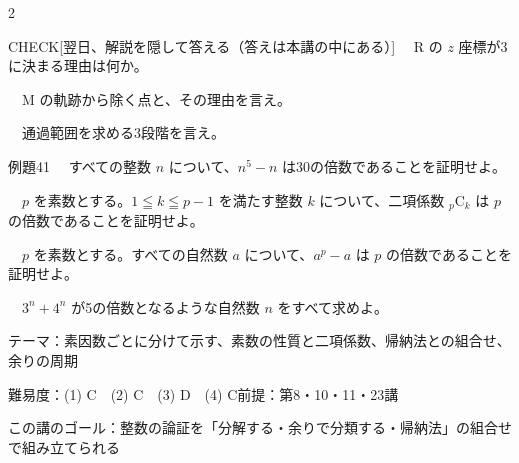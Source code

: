 \documentclass[paper=b5j, fontsize=8pt, fleqn, twoside]{jlreq}
\begin{document}
\begin{multicols*}{2}
  \begin{ptbs}{CHECK}[翌日、解説を隠して答える（答えは本講の中にある）]
    　R の $z$ 座標が3に決まる理由は何か。\par
    　M の軌跡から除く点と、その理由を言え。\par
    　通過範囲を求める3段階を言え。
  \end{ptbs}

  \notefill
  \columnbreak
  \notefill
\end{multicols*}
\begin{ascolorbox4A}[出典：オリジナル]{例題41}
  　すべての整数 $n$ について、$n^5-n$ は30の倍数であることを証明せよ。\par
  　$p$ を素数とする。$1\leqq k\leqq p-1$ を満たす整数 $k$ について、二項係数 ${}_p\mathrm C_k$ は $p$ の倍数であることを証明せよ。\par
  　$p$ を素数とする。すべての自然数 $a$ について、$a^p-a$ は $p$ の倍数であることを証明せよ。\par
  　$3^n+4^n$ が5の倍数となるような自然数 $n$ をすべて求めよ。
\end{ascolorbox4A}

\begin{Data}
  テーマ：素因数ごとに分けて示す、素数の性質と二項係数、帰納法との組合せ、余りの周期\par
  難易度：(1) C　(2) C　(3) D　(4) C\quad 前提：第8・10・11・23講\par
  この講のゴール：整数の論証を「分解する・余りで分類する・帰納法」の組合せで組み立てられる
\end{Data}
\end{document}
